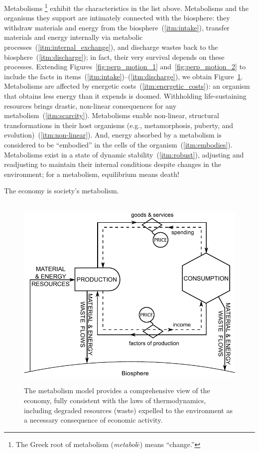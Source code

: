 Metabolisms%
	\footnote{The 
	Greek root of metabolism 
	(\emph{metabol$\bar{e}$}) means ``change.''}
exhibit the characteristics in the list above.
Metabolisms and the organisms they support
are intimately connected with the biosphere:
they withdraw materials and energy from the biosphere~(\ref{itm:intake}), 
transfer materials and energy internally via metabolic processes~(\ref{itm:internal_exchange}),
and discharge wastes back to the biosphere~(\ref{itm:discharge});
in fact, their very survival depends on these processes.
Extending Figures~\ref{fig:perp_motion_1} and~\ref{fig:perp_motion_2}
to include the facts in items~(\ref{itm:intake})--(\ref{itm:discharge}), %
we obtain Figure~\ref{fig:metabolic_economy}.
Metabolisms are affected by energetic costs~(\ref{itm:energetic_costs}): 
an organism that obtains less energy than it expends is doomed.
Withholding life-sustaining resources brings drastic, non-linear
consequences for any metabolism~(\ref{itm:scarcity}).
Metabolisms enable non-linear, structural transformations
in their host organisms (e.g., metamorphosis, puberty, and evolution)~(\ref{itm:non-linear}).
And, energy absorbed by a metabolism is considered to be ``embodied''
in the cells of the organism~(\ref{itm:embodies}).
Metabolisms exist in a state of dynamic stability~(\ref{itm:robust}),
adjusting and readjusting to maintain their internal conditions
despite changes in the environment;
for a metabolism, equilibrium means death!

The economy is society's metabolism.

\begin{figure}[!ht]
\centering\
\includegraphics[width=\linewidth]{Part_0/Chapter_Introduction/images/PERKS.pdf}
\caption[The metabolism model]{The metabolism model provides a comprehensive view 
of the economy, fully consistent with the laws of thermodynamics, 
including degraded resources (waste) expelled 
to the environment as a necessary consequence of economic activity.}
\label{fig:metabolic_economy}
\end{figure}


